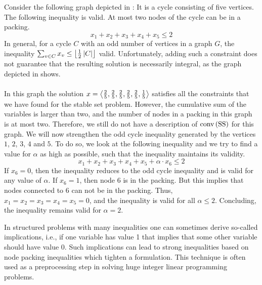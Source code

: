 \begin{example}
Consider the following graph depicted in : It is a cycle consisting of five vertices. The following inequality is valid. At most two nodes of the cycle can be in a packing.
\begin{equation}
x_1+x_2+x_3+x_4+x_5\leq 2
\end{equation}
In general, for a cycle $C$ with an odd number of vertices in a graph $G$, the inequality $\isumdomain[v]{C}{x_v\leq\floor{\frac{1}{2}\abs{C}}}$ valid. Unfortunately, adding such a constraint does not guarantee that the resulting solution is necessarily integral, as the graph depicted in  shows.



\paragraph{}
In this graph the solution $x=\tupl{\frac{2}{5},\frac{2}{5},\frac{2}{5},\frac{2}{5},\frac{2}{5},\frac{1}{5}}$ satisfies all the constraints that we have found for the stable set problem. However, the cumulative sum of the variables is larger than two, and the number of nodes in a packing in this graph is at most two. Therefore, we still do not have a description of $\funm{conv}{\mbox{SS}}$ for this graph. We will now strengthen the odd cycle inequality generated by the vertices $1$, $2$, $3$, $4$ and $5$. To do so, we look at the following inequality and we try to find a value for $\alpha$ as high as possible, such that the inequality maintains its validity.
\begin{equation}
x_1+x_2+x_3+x_4+x_5+\alpha\cdot x_6\leq 2
\end{equation}
If $x_6=0$, then the inequality reduces to the odd cycle inequality and is valid for any value of $\alpha$. If $x_6=1$, then node $6$ is in the packing. But this implies that nodes connected to $6$ can not be in the packing. Thus, $x_1=x_2=x_3=x_4=x_5=0$, and the inequality is valid for all $\alpha\leq 2$. Concluding, the inequality remains valid for $\alpha=2$.
\end{example}
\begin{application}
In structured problems with many inequalities one can sometimes derive so-called implications, i.e., if one variable has value 1 that implies that some other variable should have value 0. Such implications can lead to strong inequalities based on node packing inequalities which tighten a formulation. This technique is often used as a preprocessing step in solving huge integer linear programming problems.
\end{application}
